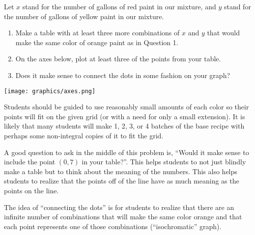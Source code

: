 \documentclass[nooutcomes, handout]{ximera}
\begin{document}
\begin{question}
Let $x$ stand for the number of gallons of red paint in our mixture, and $y$ stand for the number of gallons of yellow paint in our mixture.
\begin{enumerate}
    \item Make a table with at least three more combinations of $x$ and $y$ that would make the same color of orange paint as in Question 1.
    \item On the axes below, plot at least three of the points from your table.
    \item Does it make sense to connect the dots in some fashion on your graph?
\end{enumerate}

\texttt{[image: graphics/axes.png]}

\begin{instructorNotes}
Students should be guided to use reasonably small amounts of each color so their points will fit on the given grid (or with a need for only a small extension).  It is likely that many students will make 1, 2, 3, or 4 batches of the base recipe with perhaps some non-integral copies of it to fit the grid.

A good question to ask in the middle of this problem is, ``Would it make sense to include the point $(0,7)$ in your table?''.  This helps students to not just blindly make a table but to think about the meaning of the numbers.  This also helps students to realize that the points off of the line have as much meaning as the points on the line.

       The idea of ``connecting the dots'' is for students to realize that there are an infinite number of combinations that will make the same color orange and that each point represents one of those combinations (``isochromatic'' graph).
\end{instructorNotes}
\end{question}
\end{document}
